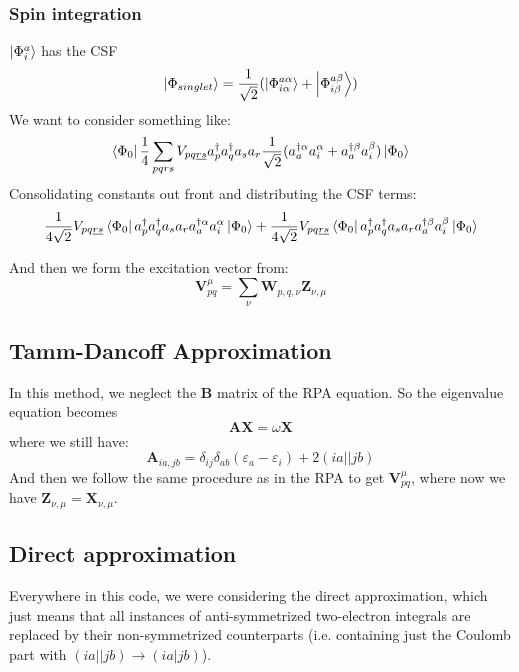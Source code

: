 \documentclass[12pt]{caltech_thesis}
\begin{document}
\subsubsection{Spin integration}
$\ket{\Phi  _i^a}$ has the CSF
\begin{equation}
    \ket{\Phi  _{singlet}} = \frac{1}{\sqrt{2}}(\ket{\Phi _{i\alpha }^{a\alpha  }} + \ket{\Phi _{i\beta }^{a\beta  }})
\end{equation}
We want to consider something like:
\begin{equation}
\bra{\Phi _0}
    \frac{1}{4}\sum_{pqrs} V_{pq\underline{rs}}a^{\dag}_{p}a^{\dag}_{q}a_{s}a_{r}\frac{1}{\sqrt{2}}(a^{\dag \alpha }_{a}a^{\alpha }_{i} + a^{\dag \beta }_{a}a^{\beta }_{i})\ket{\Phi _0}
\end{equation}
Consolidating constants out front and distributing the CSF terms:
\begin{equation}
    \frac{1}{4\sqrt{2}}V_{pq\underline{rs}}\bra{\Phi _0}a^{\dag}_{p}a^{\dag}_{q}a_{s}a_{r}a^{\dag \alpha }_{a}a^{\alpha }_{i}\ket{\Phi _0} + \frac{1}{4\sqrt{2}}V_{pq\underline{rs}}\bra{\Phi _0}a^{\dag}_{p}a^{\dag}_{q}a_{s}a_{r}a^{\dag \beta }_{a}a^{\beta }_{i}\ket{\Phi _0}
\end{equation}

And then we form the excitation vector from:
\begin{equation}
    \textbf{V}_{pq}^{\mu} = \sum_{\nu} \textbf{W}_{p,q,\nu}\textbf{Z}_{\nu, \mu}
\end{equation}

\subsection{Tamm-Dancoff Approximation}
In this method, we neglect the $\textbf{B}$ matrix of the RPA equation. So the eigenvalue equation becomes
\begin{equation}
    \textbf{A}\textbf{X} = \omega \textbf{X}
\end{equation}
where we still have:
\begin{equation}
    \textbf{A}_{ia,jb} = \delta _{ij}\delta _{ab}(\varepsilon _{a}- \varepsilon _{i}) + 2(ia||jb)
\end{equation}
And then we follow the same procedure as in the RPA to get $\textbf{V}_{pq}^{\mu}$, where now we have $\textbf{Z}_{\nu, \mu} = \textbf{X}_{\nu, \mu}$.
\subsection{Direct approximation}
Everywhere in this code, we were considering the direct approximation, which just means that all instances of anti-symmetrized two-electron integrals are replaced by their non-symmetrized counterparts (i.e. containing just the Coulomb part with $(ia||jb) \rightarrow (ia|jb)$).
\end{document}

